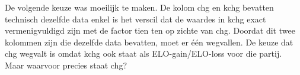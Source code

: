 De volgende keuze was moeilijk te maken. De kolom chg en kchg bevatten technisch dezelfde data enkel is het verscil dat de waardes in kchg exact vermenigvuldigd zijn met de factor tien ten op zichte van chg. Doordat dit twee kolommen zijn die dezelfde data bevatten, moet er één wegvallen. De keuze dat chg wegvalt is omdat kchg ook staat als ELO-gain/ELO-loss voor die partij. Maar waarvoor precies staat chg?

